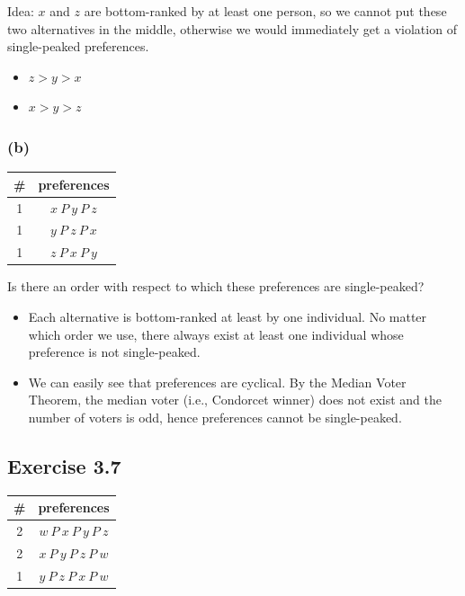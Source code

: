 \documentclass[a4paper]{article}
\begin{document}
Idea: $x$ and $z$ are bottom-ranked by at least one person, so we cannot put these two alternatives in the middle, otherwise we would immediately get a violation of single-peaked preferences. 
\begin{itemize}
    \item $z>y>x$
    \item $x>y>z$
\end{itemize}

\subsubsection*{(b)}

\begin{table}[!htbp]
    \centering
    \begin{tabular}{c|c|}
        \# & preferences         \\ 
        \hline
        1  & $x\: P\: y\: P\: z$ \\
        1  & $y\: P\: z\: P\: x$ \\
        1  & $z\: P\: x\: P\: y$ \\
        \hline
    \end{tabular}
\end{table}

Is there an order with respect to which these preferences are single-peaked?

\begin{itemize}
    \item Each alternative is bottom-ranked at least by one individual. No matter which order we use, there always exist at least one individual whose preference is not single-peaked.
    \item We can easily see that preferences are cyclical. By the Median Voter Theorem, the median voter (i.e., Condorcet winner) does not exist and the number of voters is odd, hence preferences cannot be single-peaked.
\end{itemize}

\subsection*{Exercise 3.7}

\begin{table}[!htbp]
    \centering
    \begin{tabular}{c|c|}
        \# & preferences         \\ 
        \hline
        2  & $w\: P\: x\: P\: y\: P\: z$ \\
        2  & $x\: P\: y\: P\: z\: P\: w$ \\
        1  & $y\: P\: z\: P\: x\: P\: w$ \\
        \hline
    \end{tabular}
\end{table}
\end{document}
